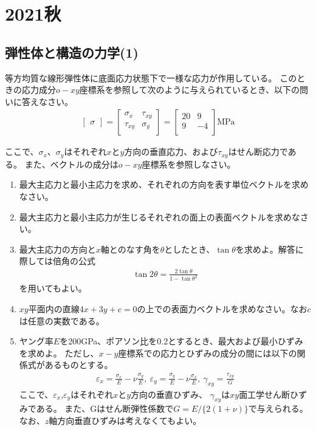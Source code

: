 \newpage
\section{2021秋}
\setcounter{yearcounter}{2021}

\subsection{弾性体と構造の力学(1)}

等方均質な線形弾性体に底面応力状態下で一様な応力が作用している。
このときの応力成分$o-xy$座標系を参照して次のように与えられているとき、以下の問いに答えなさい。
\begin{align*}%
  \begin{bmatrix}
    \sigma
  \end{bmatrix}
  =
  \begin{bmatrix}
    \sigma_x&\tau_{xy}\\
    \tau_{xy}&\sigma_y\\
  \end{bmatrix}
  =
  \begin{bmatrix}
    20 & 9\\
    9 & -4\\
  \end{bmatrix}
  \text{MPa}
\end{align*}

ここで、$\sigma_x$、$\sigma_y$はそれぞれ$x$と$y$方向の垂直応力、および$\tau_{xy}$はせん断応力である。
また、ベクトルの成分は$o-xy$座標系を参照しなさい。

\begin{enumerate}[(1)]
  \item 最大主応力と最小主応力を求め、それぞれの方向を表す単位ベクトルを求めなさい。
  \item 最大主応力と最小主応力が生じるそれぞれの面上の表面ベクトルを求めなさい。
  \item 最大主応力の方向と$x$軸とのなす角を$\theta$としたとき、$\tan \theta$を求めよ。解答に際しては倍角の公式
        \begin{align*}%
          \tan 2\theta = \frac{2\tan \theta}{1 - \tan \theta^2}
        \end{align*}
        を用いてもよい。
  \item $xy$平面内の直線$4x + 3y +c = 0$の上での表面力ベクトルを求めなさい。なお$c$は任意の実数である。
  \item ヤング率$E$を200GPa、ポアソン比を0.2とするとき、最大および最小ひずみを求めよ。
        ただし、$x-y$座標系での応力とひずみの成分の間には以下の関係式があるものとする。
        \begin{align*}%
          \varepsilon_x = \frac{\sigma_x}{E}-\nu\frac{\sigma_y}{E},\:
          \varepsilon_y = \frac{\sigma_y}{E}-\nu\frac{\sigma_x}{E},\:
          \gamma_{xy} = \frac{\tau_{xy}}{G}
        \end{align*}
        ここで、$\varepsilon_x$,$\varepsilon_y$はそれぞれ$x$と$y$方向の垂直ひずみ、
        $\gamma_{xy}$は$xy$面工学せん断ひずみである。
        また、Gはせん断弾性係数で$G=E/\{2(1+\nu)\}$で与えられる。
        なお、$z$軸方向垂直ひずみは考えなくてもよい。
\end{enumerate}

